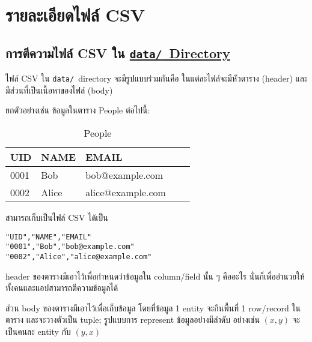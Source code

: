 \section{รายละเอียดไฟล์ CSV}

\subsection{การตีความไฟล์ CSV ใน \href{https://github.com/CS211-651/project211-oakcoding/tree/9397d355461933fb007261e2ee97445ea93eacc1/data}{\texttt{data\slash}~Directory}}

ไฟล์ CSV ใน \texttt{data\slash}~directory จะมีรูปแบบร่วมกันคือ
ในแต่ละไฟล์จะมีหัวตาราง (header) และมีส่วนที่เป็นเนื้อหาของไฟล์ (body)

ยกตัวอย่างเช่น ข้อมูลในตาราง People ต่อไปนี้:

\begin{table}[!htb]
\vspace{-\baselineskip}
\begin{tabular}{| l | l | l | l | l |}
\hline
\textbf{UID}    & \textbf{NAME}     & \textbf{EMAIL}\\
\hline\hline
0001            & Bob               & bob@example.com\\
\hline
0002            & Alice             & alice@example.com\\
\hline
\end{tabular}
\vspace{-\baselineskip}\caption{People}\label{tab:people}%
\end{table}

สามารถเก็บเป็นไฟล์ CSV ได้เป็น

\begin{lstlisting}[caption={\texttt{people.csv}},label={lst:people.csv}]
"UID","NAME","EMAIL"
"0001","Bob","bob@example.com"
"0002","Alice","alice@example.com"
\end{lstlisting}

header ของตารางมีเอาไว้เพื่อกำหนดว่าข้อมูลใน column/field นั้น ๆ คืออะไร
นั่นก็เพื่ออำนวยให้ทั้งคนและแอปสามารถตีความข้อมูลได้

ส่วน body ของตารางมีเอาไว้เพื่อเก็บข้อมูล โดยที่ข้อมูล 1 entity จะกินพื้นที่ 1 row/record ในตาราง
และจะวางตัวเป็น tuple; รูปแบบการ represent ข้อมูลอย่างมีลำดับ อย่างเช่น $ (x, y) $ จะเป็นคนละ entity กับ $ (y, x) $

